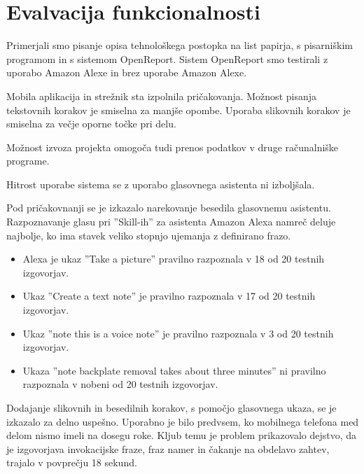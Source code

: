 \documentclass[a4paper, 12pt]{book}
\begin{document}



\section{Evalvacija funkcionalnosti}


Primerjali smo pisanje opisa tehnološkega postopka na list papirja, s pisarniškim programom in s sistemom OpenReport.
Sistem OpenReport smo testirali z uporabo Amazon Alexe in brez uporabe Amazon Alexe.

Mobila aplikacija in strežnik sta izpolnila pričakovanja.
Možnost pisanja tekstovnih korakov je smiselna za manjše opombe.
Uporaba slikovnih korakov je smiselna za večje oporne točke pri delu.

Možnost izvoza projekta omogoča tudi prenos podatkov v druge računalniške programe.

Hitrost uporabe sistema se z uporabo glasovnega asistenta ni izboljšala.

Pod pričakovnanji se je izkazalo narekovanje besedila glasovnemu asistentu.
Razpoznavanje glasu pri ''Skill-ih'' za asistenta Amazon Alexa namreč deluje najbolje, ko ima stavek veliko stopnjo ujemanja z definirano frazo.
\begin{itemize}
	\item Alexa je ukaz ''Take a picture'' pravilno razpoznala v 18 od 20 testnih izgovorjav.
	\item Ukaz ''Create a text note'' je pravilno razpoznala v 17 od 20 testnih izgovorjav.
	\item Ukaz ''note this is a voice note'' je pravilno razpoznala v 3 od 20 testnih izgovorjav.
	\item Ukaza ''note backplate removal takes about three minutes'' ni pravilno razpoznala v nobeni od 20 testnih izgovorjav.
\end{itemize}

Dodajanje slikovnih in besedilnih korakov, s pomočjo glasovnega ukaza, se je izkazalo za delno uspešno.
Uporabno je bilo predvsem, ko mobilnega telefona med delom nismo imeli na dosegu roke.
Kljub temu je problem prikazovalo dejstvo, da je izgovorjava invokacijske fraze, fraz namer in čakanje na obdelavo zahtev, trajalo v povprečju 18 sekund.
\end{document}
